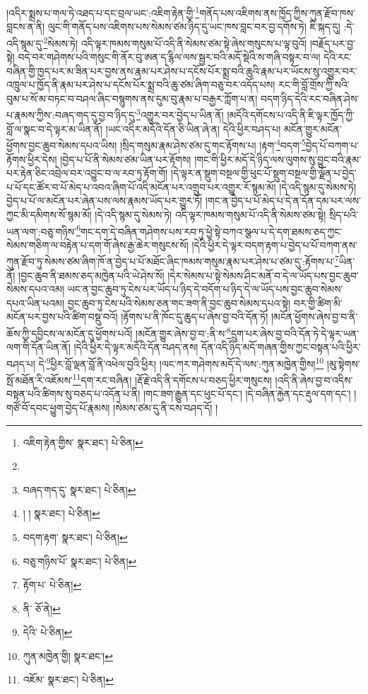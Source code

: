།འདིར་སྨྲས་པ་གལ་ཏེ་འཐད་པ་དང་བྲལ་ཡང་:འཇིག་རྟེན་གྱི་\footnote{འཇིག་རྟེན་གྱིས་  སྣར་ཐང་།  པེ་ཅིན། }གནོད་པས་འཇིགས་ནས་ཁྱོད་ཀྱིས་ཀུན་རྫོབ་ཁས་བླངས་ན་ནི། ལུང་གི་གནོད་པས་འཇིགས་པས་སེམས་ཙམ་ཉིད་དུ་ཡང་ཁས་བླང་བར་བྱ་དགོས་ཏེ། ཇི་སྐད་དུ། :དེ་འདི་སྙམ་དུ་\footnote{}སེམས་ཏེ། འདི་ལྟར་ཁམས་གསུམ་པོ་འདི་ནི་སེམས་ཙམ་སྟེ་ཞེས་གསུངས་པ་ལྟ་བུའོ། །བརྗོད་པར་བྱ་སྟེ། བདེ་བར་གཤེགས་པའི་གསུང་གི་ནོར་བུ་ཨན་ད་རྙིལ་ལས་སྦྱར་བའི་མདོ་སྡེའི་ས་གཞི་བསྟར་བ་ལ། དེའི་རང་བཞིན་གྱི་ཁྱད་པར་མ་ཟིན་པར་བྱས་ནས་རྣམ་པར་ཤེས་པ་དངོས་པོར་སྨྲ་བའི་ཆུའི་རྣམ་པར་ཡོངས་སུ་འགྱུར་བར་འཁྲུལ་པ་ཁྱོད་ནི་རྣམ་པར་ཤེས་པ་དངོས་པོར་སྨྲ་བའི་ཆུ་ཙམ་ཞིག་བཅུ་བར་འདོད་པས། རང་གི་བློ་གྲོས་ཀྱི་སའི་བུམ་པ་སོ་མ་བཏང་བ་བཤལ་ཞིང་བསྙུགས་ནས་དུམ་བུ་རྣམ་པ་བརྒྱར་ཀློག་པ་ན། བདག་ཉིད་དེའི་རང་བཞིན་ཤེས་པ་རྣམས་ཀྱིས་:བཞད་གད་དུ་བྱ་བ་ཉིད་དུ་\footnote{བཞད་གད་དུ་  སྣར་ཐང་།  པེ་ཅིན། }འགྱུར་བར་བྱེད་པ་ཡིན་ནོ། །མདོའི་དགོངས་པ་འདི་ནི་ཇི་ལྟར་ཁྱོད་ཀྱི་བློ་ལ་སྣང་བ་དེ་ལྟར་མ་ཡིན་ནོ། །ཡང་འདིར་མདོའི་དོན་ཅི་ཡིན་ཞེ་ན། དེའི་ཕྱིར་བཤད་པ། མངོན་གྱུར་མངོན་ཕྱོགས་བྱང་ཆུབ་སེམས་དཔའ་ཡིས། །སྲིད་གསུམ་རྣམ་ཤེས་ཙམ་དུ་གང་རྟོགས་པ། །རྟག་\footnote{། །  སྣར་ཐང་།  པེ་ཅིན། }བདག་\footnote{བདག་རྟག་  སྣར་ཐང་།  པེ་ཅིན། }བྱེད་པོ་བཀག་པ་རྟོགས་ཕྱིར་དེས། །བྱེད་པ་པོ་ནི་སེམས་ཙམ་ཡིན་པར་རྟོགས། །གང་གི་ཕྱིར་མདོ་དེ་ཉིད་ལས་ལུགས་སུ་བྱུང་བའི་རྣམ་པར་རྟེན་ཅིང་འབྲེལ་བར་འབྱུང་བ་ལ་རབ་ཏུ་རྟོག་གོ། །དེ་ལྟར་ན་སྡུག་བསྔལ་གྱི་ཕུང་པོ་སྡུག་བསྔལ་གྱི་ལྗོན་པ་བྱེད་པ་པོ་དང་ཚོར་བ་པོ་མེད་པ་འབའ་ཞིག་པོ་འདི་མངོན་པར་འགྲུབ་པར་འགྱུར་རོ་སྙམ་མོ། །དེ་འདི་སྙམ་དུ་སེམས་ཏེ། བྱེད་པ་པོ་ལ་མངོན་པར་ཞེན་པས་ལས་རྣམས་ཡོད་པར་གྱུར་ཏོ། །གང་ན་བྱེད་པ་པོ་མེད་པ་དེ་ན་དོན་དམ་པར་ལས་ཀྱང་མི་དམིགས་སོ་སྙམ་མོ། །དེ་འདི་སྙམ་དུ་སེམས་ཏེ། འདི་ལྟར་ཁམས་གསུམ་པོ་འདི་ནི་སེམས་ཙམ་སྟེ། སྲིད་པའི་ཡན་ལག་:བཅུ་གཉིས་\footnote{བཅུ་གཉིས་པོ་  སྣར་ཐང་།  པེ་ཅིན། }གང་དག་དེ་བཞིན་གཤེགས་པས་རབ་ཏུ་ཕྱེ་སྟེ་བཀའ་སྩལ་པ་དེ་དག་ཐམས་ཅད་ཀྱང་སེམས་གཅིག་ལ་བརྟེན་པ་དག་གོ་ཞེས་རྒྱ་ཆེར་གསུངས་སོ། །དེའི་ཕྱིར་དེ་ལྟར་བདག་རྟག་པ་བྱེད་པ་པོ་བཀག་ནས་ཀུན་རྫོབ་ཏུ་སེམས་ཙམ་ཞིག་ཁོ་ན་བྱེད་པ་པོ་མཐོང་ཞིང་ཁམས་གསུམ་རྣམ་པར་ཤེས་པ་ཙམ་དུ་:རྟོགས་པ་\footnote{རྟོག་པ་  པེ་ཅིན། }ཡིན་ནོ། །བྱང་ཆུབ་ནི་ཐམས་ཅད་མཁྱེན་པའི་ཡེ་ཤེས་སོ། །དེར་སེམས་པ་སྟེ་སེམས་ཤིང་མནོ་བ་དེ་ལ་ཡོད་པས་བྱང་ཆུབ་སེམས་དཔའ་འམ། ཡང་ན་བྱང་ཆུབ་ཏུ་ངེས་པར་ཡོད་པ་ཉིད་དེ་བདོག་པ་ཉིད་དེ་ལ་ཡོད་པས་བྱང་ཆུབ་སེམས་དཔའ་ཡིན་པའམ། བྱང་ཆུབ་ཏུ་ངེས་པའི་སེམས་ཅན་གང་ཟག་ནི་བྱང་ཆུབ་སེམས་དཔའ་སྟེ། བར་གྱི་ཚིག་མི་མངོན་པར་བྱས་པའི་ཚིག་བསྡུ་བའོ། །རྟོགས་པ་ནི་ཁོང་དུ་ཆུད་པ་ཞེས་བྱ་བའི་དོན་ཏོ། །མངོན་ཕྱོགས་ཞེས་བྱ་བ་ནི་ཆོས་ཀྱི་དབྱིངས་ལ་མངོན་དུ་ཕྱོགས་པའོ། །མངོན་གྱུར་ཞེས་བྱ་བ་:ནི་ས་\footnote{ནི་  ཅོ་ནེ། }དྲུག་པར་ཞེས་བྱ་བའི་དོན་ཏེ་དེ་ལྟར་ཡན་ལག་གི་དོན་ཡིན་ནོ། །དེའི་ཕྱིར་དེ་ལྟར་མདོའི་དོན་བཤད་ནས། དོན་འདི་ཉིད་མདོ་གཞན་གྱིས་ཀྱང་བསྟན་པའི་ཕྱིར་བཤད་པ། དེ་\footnote{དེའི་  པེ་ཅིན། }ཕྱིར་བློ་ལྡན་བློ་ནི་འཕེལ་བྱའི་ཕྱིར། །ལང་ཀར་གཤེགས་མདོ་དེ་ལས་:ཀུན་མཁྱེན་གྱིས།\footnote{ཀུན་མཁྱེན་གྱི།  སྣར་ཐང་། } །མུ་སྟེགས་སྤོ་མཐོན་རི་འཇོམས་\footnote{འཇོམ་  སྣར་ཐང་།  པེ་ཅིན། }དག་རང་བཞིན། །རྡོ་རྗེ་འདི་ནི་དགོངས་པ་བཅད་ཕྱིར་གསུངས། །འདི་ནི་ཞེས་བྱ་བ་འདིས་བསྟན་པའི་ཚིགས་སུ་བཅད་པ་འདོན་པ་ནི། །གང་ཟག་རྒྱུན་དང་ཕུང་པོ་དང་། །དེ་བཞིན་རྐྱེན་དང་རྡུལ་དག་དང་། །གཙོ་བོ་དབང་ཕྱུག་བྱེད་པོ་རྣམས། །སེམས་ཙམ་དུ་ནི་ངས་བཤད་དོ། །
